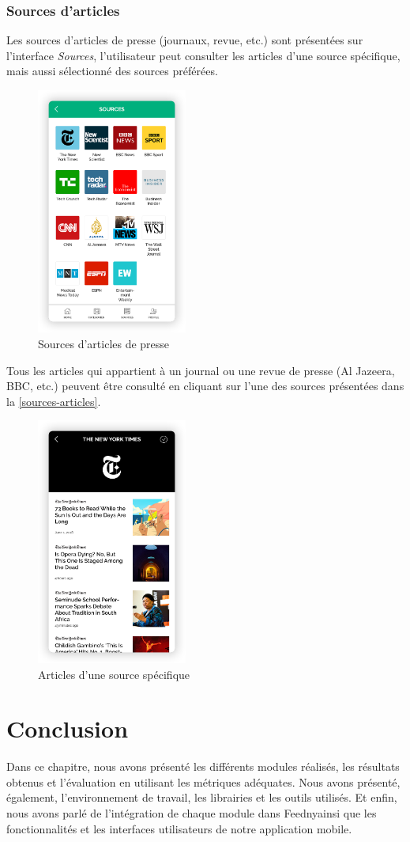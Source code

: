  \subsubsection{Sources d'articles}
Les sources d'articles de presse (journaux, revue, etc.) sont présentées sur l'interface \emph{Sources}, l'utilisateur peut consulter les articles d'une source spécifique, mais aussi sélectionné des sources préférées.
\begin{figure}[H]
    \centering
    \includegraphics[width=140pt]{img/chapter4/feedny/en-sources.png}
    \caption{Sources d'articles de presse}
\end{figure}

Tous les articles qui appartient à un journal ou une revue de presse (Al Jazeera, BBC, etc.) peuvent être consulté en cliquant sur l'une des sources présentées dans la \autoref{sources-articles}.
\begin{figure}[H]
    \centering
    \includegraphics[width=140pt]{img/chapter4/feedny/en-articles-sources.png}
    \caption{Articles d'une source spécifique}
    \label{sources-articles}
\end{figure}

\section{Conclusion}
Dans ce chapitre, nous avons présenté les différents modules réalisés, les résultats obtenus et l'évaluation en utilisant les métriques adéquates. Nous avons présenté, également, l'environnement de travail, les librairies et les outils utilisés. Et enfin, nous avons parlé de l'intégration de chaque module dans \textquotedbl Feedny\textquotedbl ainsi que les fonctionnalités et les interfaces utilisateurs de notre application mobile.